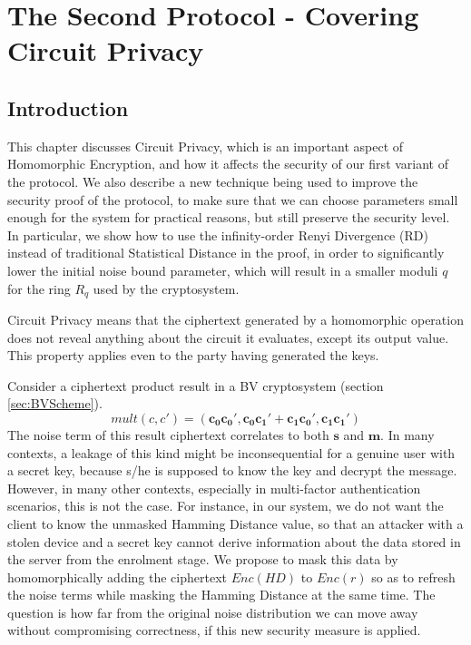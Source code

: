\chapter{The Second Protocol - Covering Circuit Privacy}
\label{chap:renyiDivergence}

\ifpdf
    \graphicspath{{Chapter4/Figs/Raster/}{Chapter4/Figs/PDF/}{Chapter4/Figs/}}
\else
    \graphicspath{{Chapter4/Figs/Vector/}{Chapter4/Figs/}}
\fi

\section{Introduction}
\label{sec:secProcIntro}
This chapter discusses Circuit Privacy, which is an important aspect of
Homomorphic Encryption, and how it affects the security of our first variant
of the protocol. We also describe a new technique being used to improve the
security proof of the protocol, to make sure that we can choose parameters small
enough for the system for practical reasons, but still preserve the security level. In
particular, we show how to use the infinity-order Renyi Divergence (RD) instead of
traditional Statistical Distance in the proof, in order to significantly lower the initial noise bound parameter, which will result in a smaller moduli \(q\) for the ring \(R_{q}\) used by the
cryptosystem.

Circuit Privacy means that the ciphertext generated by a homomorphic operation
does not reveal anything about the circuit it evaluates, except its output
value. This property applies even to the party having generated the
keys.

Consider a ciphertext product result in a BV cryptosystem (section
\ref{sec:BVScheme}).
\[
  mult(c,c') = (\mathbf{c_0}\mathbf{c_0'}, \mathbf{c_0}\mathbf{c_1'} +
  \mathbf{c_1}\mathbf{c_0'}, \mathbf{c_1}\mathbf{c_1'})
\]
The noise term of this result ciphertext correlates to both $\mathbf{s}$ and $\mathbf{m}$.
In many contexts, a leakage of this kind might be inconsequential for a genuine user with a secret key, because s/he is supposed to know the key and decrypt the message.
However, in many other contexts, especially in multi-factor authentication
scenarios, this is not the case. For instance, in our system, we do not want the
client to know the unmasked Hamming Distance value, so that an attacker with a stolen
device and a secret key cannot derive information about the data stored in the
server from the enrolment stage. We propose to mask this data by homomorphically adding the ciphertext
$Enc(HD)$ to $Enc(r)$ so as to refresh the noise terms while masking the Hamming Distance at the same time. The question is how far from the original noise distribution we can move away without compromising correctness, if this new security measure is applied.

